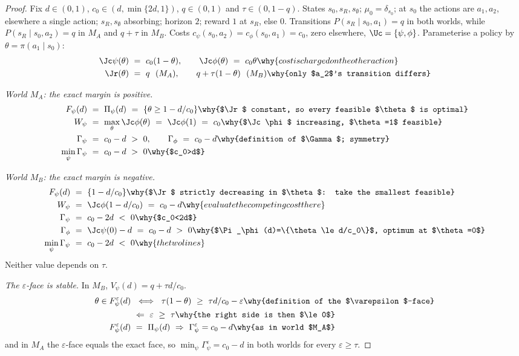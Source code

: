 \begin{proof}
Fix $d\in(0,1)$, $c_0\in(d,\min\{2d,1\})$, $q\in(0,1)$ and
$\tau\in(0,1-q)$. States $s_0,s_R,s_\emptyset$; $\mu_0=\delta_{s_0}$; at
$s_0$ the actions are $a_1,a_2$, elsewhere a single action;
$s_R,s_\emptyset$ absorbing; horizon $2$; reward $1$ at $s_R$, else $0$.
Transitions $P(s_R\mid s_0,a_1)=q$ in both worlds, while
$P(s_R\mid s_0,a_2)=q$ in $M_A$ and $q+\tau$ in $M_B$.
Costs $c_\psi(s_0,a_2)=c_\phi(s_0,a_1)=c_0$, zero elsewhere,
$\Uc=\{\psi,\phi\}$. Parameterise a policy by $\theta=\pi(a_1\mid s_0)$:
\begin{align*}
\Jc\psi(\theta)\ &=\ c_0(1-\theta),\qquad \Jc\phi(\theta)\ =\ c_0\theta
   \why{cost is charged on the other action}\\
\Jr(\theta)\ &=\ q \ \ (M_A),\qquad q+\tau(1-\theta)\ \ (M_B)
   \why{only $a_2$'s transition differs}
\end{align*}

\emph{World $M_A$: the exact margin is positive.}
\begin{align*}
F_\psi(d)\ &=\ \Pi_\psi(d)\ =\ \{\theta\ge1-d/c_0\}
   \why{$\Jr$ constant, so every feasible $\theta$ is optimal}\\
W_\psi\ &=\ \max_\theta \Jc\phi(\theta)\ =\ \Jc\phi(1)\ =\ c_0
   \why{$\Jc\phi$ increasing, $\theta=1$ feasible}\\
\Gamma_\psi\ &=\ c_0-d\ >\ 0,\qquad \Gamma_\phi\ =\ c_0-d
   \why{definition of $\Gamma$; symmetry}\\
\min_\psi\Gamma_\psi\ &=\ c_0-d\ >\ 0 \why{$c_0>d$}
\end{align*}

\emph{World $M_B$: the exact margin is negative.}
\begin{align*}
F_\psi(d)\ &=\ \{1-d/c_0\}
   \why{$\Jr$ strictly decreasing in $\theta$: take the smallest feasible}\\
W_\psi\ &=\ \Jc\phi(1-d/c_0)\ =\ c_0-d
   \why{evaluate the competing cost there}\\
\Gamma_\psi\ &=\ c_0-2d\ <\ 0 \why{$c_0<2d$}\\
\Gamma_\phi\ &=\ \Jc\psi(0)-d\ =\ c_0-d\ >\ 0
   \why{$\Pi_\phi(d)=\{\theta\le d/c_0\}$, optimum at $\theta=0$}\\
\min_\psi\Gamma_\psi\ &=\ c_0-2d\ <\ 0 \why{the two lines}
\end{align*}
Neither value depends on $\tau$.

\emph{The $\varepsilon$-face is stable.} In $M_B$,
$V_\psi(d)=q+\tau d/c_0$.
\begin{align*}
\theta\in F^\varepsilon_\psi(d)\ &\iff\ \tau(1-\theta)\ \ge\ \tau d/c_0-\varepsilon
   \why{definition of the $\varepsilon$-face}\\
   &\Leftarrow\ \varepsilon\ \ge\ \tau
   \why{the right side is then $\le0$}\\
F^\varepsilon_\psi(d)\ &=\ \Pi_\psi(d)\ \Rightarrow\ \Gamma^\varepsilon_\psi=c_0-d
   \why{as in world $M_A$}
\end{align*}
and in $M_A$ the $\varepsilon$-face equals the exact face, so
$\min_\psi\Gamma^\varepsilon_\psi=c_0-d$ in both worlds for every
$\varepsilon\ge\tau$.


\end{proof}
